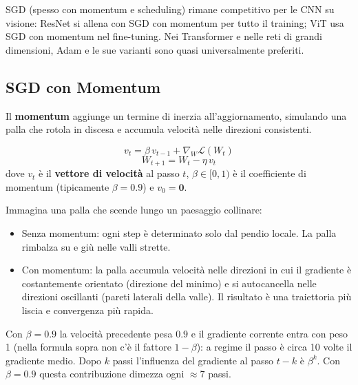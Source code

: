 \documentclass[
  11pt,
]{article}
\begin{document}
\begin{notabox}[title={\textbf{Quando usare SGD?}}]
SGD (spesso con momentum e scheduling) rimane competitivo per le CNN su visione: ResNet si allena con SGD con momentum per tutto il training; ViT usa SGD con momentum nel fine-tuning. Nei Transformer e nelle reti di grandi dimensioni, Adam e le sue varianti sono quasi universalmente preferiti.
\end{notabox}

\subsection{SGD con Momentum}

Il \textbf{momentum} aggiunge un termine di inerzia all'aggiornamento, simulando una palla che rotola in discesa e accumula velocità nelle direzioni consistenti.

\begin{formulabox}[title={\textbf{SGD con Momentum}}]
\[
v_t = \beta\, v_{t-1} + \nabla_W \mathcal{L}(W_t)
\]
\[
W_{t+1} = W_t - \eta\, v_t
\]
dove $v_t$ è il \textbf{vettore di velocità} al passo $t$, $\beta \in [0,1)$ è il coefficiente di momentum (tipicamente $\beta = 0.9$) e $v_0 = \mathbf{0}$.
\end{formulabox}

\begin{notabox}[title={\textbf{Intuizione: la palla che rotola in discesa}}]
Immagina una palla che scende lungo un paesaggio collinare:
\begin{itemize}
  \item Senza momentum: ogni step è determinato solo dal pendio locale. La palla rimbalza su e giù nelle valli strette.
  \item Con momentum: la palla accumula velocità nelle direzioni in cui il gradiente è costantemente orientato (direzione del minimo) e si autocancella nelle direzioni oscillanti (pareti laterali della valle). Il risultato è una traiettoria più liscia e convergenza più rapida.
\end{itemize}
Con $\beta = 0.9$ la velocità precedente pesa $0.9$ e il gradiente corrente entra con peso 1 (nella formula sopra non c'è il fattore $1-\beta$): a regime il passo è circa 10 volte il gradiente medio. Dopo $k$ passi l'influenza del gradiente al passo $t-k$ è $\beta^k$. Con $\beta=0.9$ questa contribuzione dimezza ogni $\approx 7$ passi.
\end{notabox}

\end{document}
